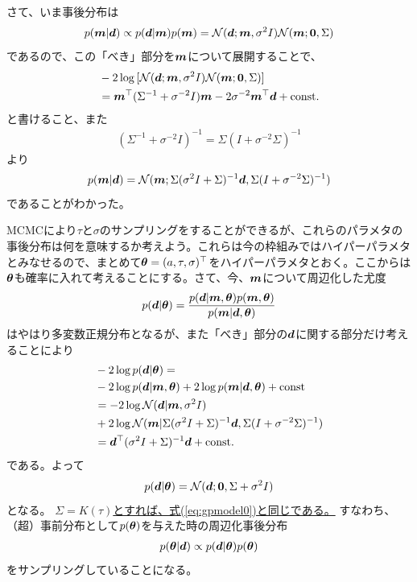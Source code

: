 さて、いま事後分布は
\begin{align}
\label{eq:gppos}
p(\boldsymbol{m}|\boldsymbol{d}) \propto p(\boldsymbol{d}|\boldsymbol{m}) p(\boldsymbol{m}) = \mathcal{N} (\boldsymbol{d};\boldsymbol{m},\sigma^2 I) \mathcal{N} (\boldsymbol{m};\boldsymbol{0},\Sigma)
\end{align}
であるので、この「べき」部分を$\boldsymbol{m}$について展開することで、
\begin{align}
\label{eq:gpposs}
&- 2 \log{[\mathcal{N}(\boldsymbol{d};\boldsymbol{m},\sigma^2 I) \mathcal{N}(\boldsymbol{m};\boldsymbol{0},\Sigma)]} \nonumber \\
&= \boldsymbol{m}^\top (\Sigma^{-1} + \sigma^{-2} I ) \boldsymbol{m} - 2 \sigma^{-2} \boldsymbol{m}^\top \boldsymbol{d} + \mathrm{const.} 
\end{align}
と書けること、また
\begin{align}
\label{eq:gppossxx}
(\Sigma^{-1} + \sigma^{-2} I )^{-1} = \Sigma (I + \sigma^{-2} \Sigma )^{-1}
\end{align}
より
\begin{align}
\label{eq:gpposss}
p(\boldsymbol{m}|\boldsymbol{d}) = \mathcal{N} (\boldsymbol{m};\Sigma (\sigma^{2} I + \Sigma )^{-1} \boldsymbol{d}, \Sigma (I + \sigma^{-2} \Sigma )^{-1} )
\end{align}
であることがわかった。

MCMCにより$\tau$と$\sigma$のサンプリングをすることができるが、これらのパラメタの事後分布は何を意味するか考えよう。これらは今の枠組みではハイパーパラメタとみなせるので、まとめて$\boldsymbol{\theta} = (a, \tau, \sigma)^\top$をハイパーパラメタとおく。ここからは$\boldsymbol{\theta}$も確率に入れて考えることにする。さて、今、$\boldsymbol{m}$について周辺化した尤度
\begin{align}
\label{eq:gppozz}
p(\boldsymbol{d}|\boldsymbol{\theta}) = \frac{p(\boldsymbol{d}|\boldsymbol{m},\boldsymbol{\theta}) p(\boldsymbol{m},\boldsymbol{\theta})}{p(\boldsymbol{m}|\boldsymbol{d},\boldsymbol{\theta})}
\end{align}
はやはり多変数正規分布となるが、また「べき」部分の$\boldsymbol{d}$に関する部分だけ考えることにより
\begin{align}
\label{eq:gppozzp}
&- 2 \log p(\boldsymbol{d}|\boldsymbol{\theta}) = \nonumber \\
&- 2 \log p(\boldsymbol{d}|\boldsymbol{m},\boldsymbol{\theta}) + 2 \log p(\boldsymbol{m}|\boldsymbol{d},\boldsymbol{\theta}) + \mathrm{const} \nonumber \\
&= - 2 \log \mathcal{N}(\boldsymbol{d}|\boldsymbol{m}, \sigma^2 I )  \nonumber \\
&+ 2 \log \mathcal{N}(\boldsymbol{m}|\Sigma (\sigma^{2} I + \Sigma )^{-1} \boldsymbol{d}, \Sigma (I + \sigma^{-2} \Sigma )^{-1} ) \nonumber \\
&= \boldsymbol{d}^\top (\sigma^{2} I + \Sigma)^{-1} \boldsymbol{d} + \mathrm{const.}
\end{align}
である。よって
\begin{align}
\label{eq:gmarg}
p(\boldsymbol{d}|\boldsymbol{\theta}) =  \mathcal{N} (\boldsymbol{d}; \boldsymbol{0}, \Sigma + \sigma^{2} I )
\end{align}
となる。
\underline{$\Sigma = K(\tau)$とすれば、式(\ref{eq:gpmodel0})と同じである。} 
すなわち、（超）事前分布として$p(\boldsymbol{\theta})$を与えた時の周辺化事後分布
\begin{align}
\label{eq:gmpost}
p(\boldsymbol{\theta}|\boldsymbol{d}) \propto p(\boldsymbol{d}|\boldsymbol{\theta}) p(\boldsymbol{\theta})
\end{align}
をサンプリングしていることになる。


